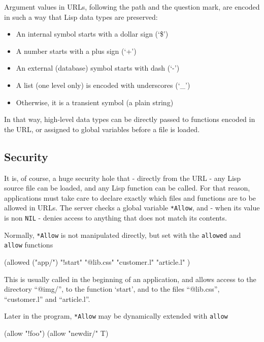 Argument values in URLs, following the path and the question mark, are
encoded in such a way that Lisp data types are preserved:

\begin{itemize}
\item An internal symbol starts with a dollar sign (`\$')
\item A number starts with a plus sign (`+')
\item An external (database) symbol starts with dash (`-')
\item A list (one level only) is encoded with underscores (`\_')
\item Otherwise, it is a transient symbol (a plain string)
\end{itemize}

In that way, high-level data types can be directly passed to functions
encoded in the URL, or assigned to global variables before a file is
loaded.

 
\subsection{Security}
\label{sec:appl-devel-security}

It is, of course, a huge security hole that - directly from the URL -
any Lisp source file can be loaded, and any Lisp function can be called.
For that reason, applications must take care to declare exactly which
files and functions are to be allowed in URLs. The server checks a
global variable \texttt{*Allow}, and - when its value is non \texttt{NIL} - denies
access to anything that does not match its contents.

Normally, \texttt{*Allow} is not manipulated directly, but set with the
\texttt{allowed} and \texttt{allow} functions


\begin{wideverbatim}
(allowed ("app/")
   "!start" "@lib.css" "customer.l" "article.l" )
\end{wideverbatim}

This is usually called in the beginning of an application, and allows
access to the directory ``@img/'', to the function `start', and to the
files ``@lib.css'', ``customer.l'' and ``article.l''.

Later in the program, \texttt{*Allow} may be dynamically extended with \texttt{allow}


\begin{wideverbatim}
(allow "!foo")
(allow "newdir/" T)
\end{wideverbatim}


